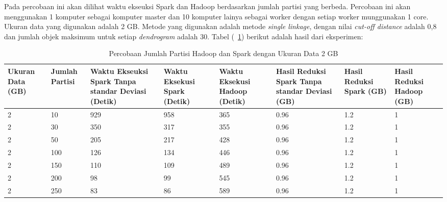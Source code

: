 
Pada percobaan ini akan dilihat waktu ekseuksi Spark dan Hadoop berdasarkan jumlah partisi yang berbeda. Percobaan ini akan menggunakan 1 komputer sebagai komputer master dan 10 komputer lainya sebagai worker dengan setiap worker munggunakan 1 core. Ukuran data yang digunakan adalah 2 GB. Metode yang digunakan adalah metode \textit{single linkage}, dengan nilai \textit{cut-off distance} adalah 0,8 dan jumlah objek maksimum untuk setiap \textit{dendrogram} adalah 30. Tabel (~\ref{tab:spark2}) berikut adalah hasil dari eksperimen:

\begin{table}[H] 
	\centering 
	\caption{Percobaan Jumlah Partisi Hadoop dan Spark dengan Ukuran Data 2 GB}
	\label{tab:spark2}
	\begin{tabular}{|p{1.1cm}|p{1.1cm}|p{2.5cm}|p{2.5cm}|p{2.5cm}|p{2cm}|p{1.5cm}|p{1.5cm}|}
\hline
Ukuran Data (GB) & Jumlah Partisi &  Waktu Ekseuksi Spark Tanpa standar Deviasi (Detik) & Waktu Eksekusi Spark (Detik) & Waktu Eksekusi Hadoop (Detik) & Hasil Reduksi Spark Tanpa standar Deviasi (GB) & Hasil Reduksi Spark (GB)  & Hasil Reduksi Hadoop (GB)\\ 
\hline
2 & 10 & 929  & 958  & 365  & 0.96 & 1.2 & 1 \\
\hline
2 & 30 & 350  & 317  & 355  & 0.96 & 1.2 & 1 \\
\hline
2 & 50 & 205  & 217  & 428  & 0.96 & 1.2 & 1 \\
\hline
2 & 100 & 126  & 134  & 446  & 0.96 & 1.2 & 1 \\
\hline
2 & 150 & 110  & 109  & 489  & 0.96 & 1.2 & 1 \\
\hline
2 & 200 & 98  & 99  & 545  & 0.96 & 1.2 & 1 \\
\hline
2 & 250 & 83  & 86  & 589  & 0.96 & 1.2 & 1 \\
\hline

\hline

	\end{tabular} 
\end{table}



\def\scl{1}

\def\leg{} 
\def\std{none}
\def\ymin{}
\def\ymax{}

